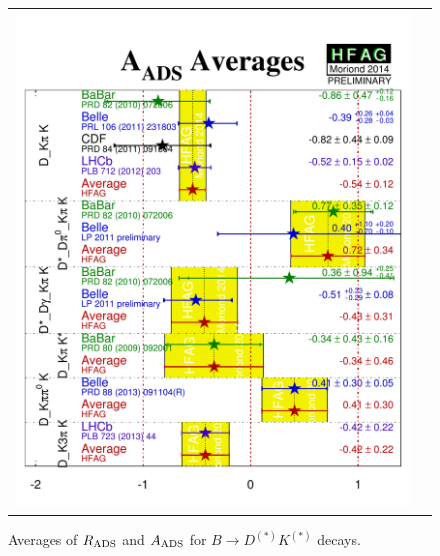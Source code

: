 \begin{figure}[htbp]
\begin{center}
\begin{tabular}{cc}
{        \includegraphics{figures/cp_uta/A_ADS}
      }
    \end{tabular}
  \end{center}
  \vspace{-0.8cm}
  \caption{
    Averages of $R_{\rm ADS}$ and $A_{\rm ADS}$ for $B \to D^{(*)}K^{(*)}$ decays.
  }
  \label{fig:cp_uta:cus:ads}
\end{figure}

